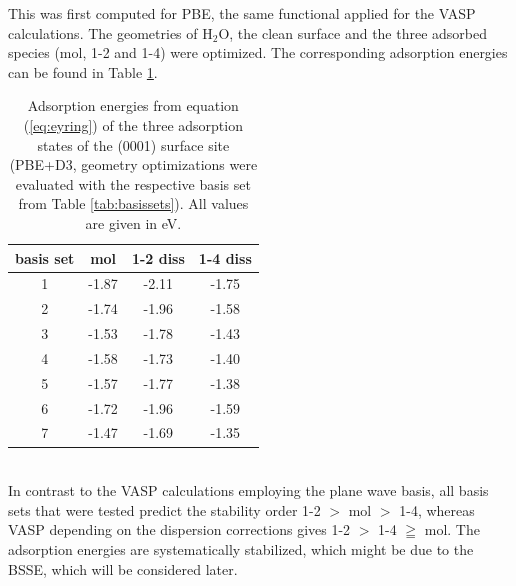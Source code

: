 \documentclass[11pt,DIV=13,BCOR=5mm,a4paper,headinclude]{scrbook}
\begin{document}
This was first computed for PBE, the same functional applied for the VASP calculations.
The geometries of H$_2$O, the clean surface and the three adsorbed species (mol, 1-2 and 1-4) were optimized.
The corresponding adsorption energies can be found in Table \ref{tab:basisset-results-PBE+D3}.
\begin{table}[!h]
  \centering
   \caption{Adsorption energies from equation (\ref{eq:eyring}) of the three adsorption states of the (0001) surface site (PBE+D3, geometry optimizations were evaluated with the respective basis set from Table \ref{tab:basissets}).
All values are given in eV.}
  \begin{tabular}{c|ccc}
  \toprule
  basis set & mol & 1-2 diss & 1-4 diss \\\midrule
  1 &-1.87 &-2.11 &-1.75 \\
  2 &-1.74 &-1.96 &-1.58 \\
  3 &-1.53 &-1.78 &-1.43 \\
  4 &-1.58 &-1.73 &-1.40 \\
  5 &-1.57 &-1.77 &-1.38 \\
  6 &-1.72 &-1.96 &-1.59 \\
  7 &-1.47 &-1.69 &-1.35 \\\bottomrule  
  \end{tabular}
  \label{tab:basisset-results-PBE+D3}
\end{table}
\\

In contrast to the VASP calculations employing the plane wave basis, all basis sets that were tested predict the stability order 1-2 $>$ mol $>$ 1-4, whereas VASP depending on the dispersion corrections gives 1-2 $>$ 1-4 $\geqq$ mol.
The adsorption energies are systematically stabilized, which might be due to the BSSE, which will be considered later.
\end{document}
